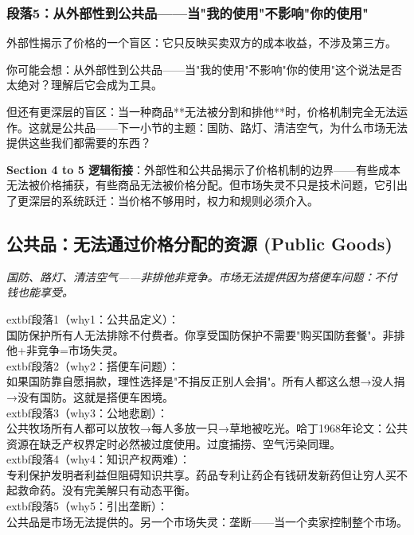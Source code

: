 \documentclass[a4paper,12pt]{book}
\newenvironment{motivation}{\begin{tcolorbox}[colback=gray!10,colframe=gray!60,title=\textit{本章动机},fonttitle=\bfseries,arc=0mm,leftrule=3mm]\small\itshape}{\end{tcolorbox}}
\begin{document}
\begin{motivation}
	\subsubsection*{段落5：从外部性到公共品——当"我的使用"不影响"你的使用"}
	外部性揭示了价格的一个盲区：它只反映买卖双方的成本收益，不涉及第三方。
	\begin{tcolorbox}[colback=yellow!5, title=\textit{读者行为预测}]
		你可能会想：从外部性到公共品——当"我的使用"不影响"你的使用"这个说法是否太绝对？理解后它会成为工具。
	\end{tcolorbox}

但还有更深层的盲区：当一种商品**无法被分割和排他**时，价格机制完全无法运作。这就是公共品——下一小节的主题：国防、路灯、清洁空气，为什么市场无法提供这些我们都需要的东西？

	\textbf{Section 4 to 5 逻辑衔接}：外部性和公共品揭示了价格机制的边界——有些成本无法被价格捕获，有些商品无法被价格分配。但市场失灵不只是技术问题，它引出了更深层的系统跃迁：当价格不够用时，权力和规则必须介入。

	
	\subsection{公共品：无法通过价格分配的资源 (Public Goods)}
	\begin{motivation}国防、路灯、清洁空气——非排他非竞争。市场无法提供因为搭便车问题：不付钱也能享受。\end{motivation}
		extbf{段落1（why1：公共品定义）}：\\国防保护所有人无法排除不付费者。你享受国防保护不需要"购买国防套餐"。非排他+非竞争=市场失灵。\\	extbf{段落2（why2：搭便车问题）}：\\如果国防靠自愿捐款，理性选择是"不捐反正别人会捐"。所有人都这么想→没人捐→没有国防。这就是搭便车困境。\\	extbf{段落3（why3：公地悲剧）}：\\公共牧场所有人都可以放牧→每人多放一只→草地被吃光。哈丁1968年论文：公共资源在缺乏产权界定时必然被过度使用。过度捕捞、空气污染同理。\\	extbf{段落4（why4：知识产权两难）}：\\专利保护发明者利益但阻碍知识共享。药品专利让药企有钱研发新药但让穷人买不起救命药。没有完美解只有动态平衡。\\	extbf{段落5（why5：引出垄断）}：\\公共品是市场无法提供的。另一个市场失灵：垄断——当一个卖家控制整个市场。


\end{motivation}
\end{document}

